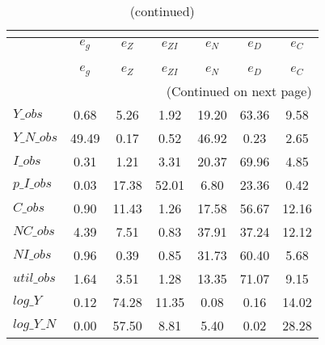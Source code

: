  
\begin{center}
\begin{longtable}{lcccccc} 
\caption{VARIANCE DECOMPOSITION (in percent)}\\
 \label{Table:th_var_decomp_uncond}\\
\toprule 
$           $	 & 	 $       {e_g}$	 & 	 $       {e_Z}$	 & 	 $    {e_{ZI}}$	 & 	 $       {e_N}$	 & 	 $       {e_D}$	 & 	 $       {e_C}$\\
\midrule \endfirsthead 
\caption{(continued)}\\
 \toprule \\ 
$           $	 & 	 $       {e_g}$	 & 	 $       {e_Z}$	 & 	 $    {e_{ZI}}$	 & 	 $       {e_N}$	 & 	 $       {e_D}$	 & 	 $       {e_C}$\\
\midrule \endhead 
\midrule \multicolumn{7}{r}{(Continued on next page)} \\ \bottomrule \endfoot 
\bottomrule \endlastfoot 
$Y\_obs     $	 & 	        0.68	 & 	        5.26	 & 	        1.92	 & 	       19.20	 & 	       63.36	 & 	        9.58 \\ 
$Y\_N\_obs  $	 & 	       49.49	 & 	        0.17	 & 	        0.52	 & 	       46.92	 & 	        0.23	 & 	        2.65 \\ 
$I\_obs     $	 & 	        0.31	 & 	        1.21	 & 	        3.31	 & 	       20.37	 & 	       69.96	 & 	        4.85 \\ 
$p\_I\_obs  $	 & 	        0.03	 & 	       17.38	 & 	       52.01	 & 	        6.80	 & 	       23.36	 & 	        0.42 \\ 
$C\_obs     $	 & 	        0.90	 & 	       11.43	 & 	        1.26	 & 	       17.58	 & 	       56.67	 & 	       12.16 \\ 
$NC\_obs    $	 & 	        4.39	 & 	        7.51	 & 	        0.83	 & 	       37.91	 & 	       37.24	 & 	       12.12 \\ 
$NI\_obs    $	 & 	        0.96	 & 	        0.39	 & 	        0.85	 & 	       31.73	 & 	       60.40	 & 	        5.68 \\ 
$util\_obs  $	 & 	        1.64	 & 	        3.51	 & 	        1.28	 & 	       13.35	 & 	       71.07	 & 	        9.15 \\ 
$log\_Y     $	 & 	        0.12	 & 	       74.28	 & 	       11.35	 & 	        0.08	 & 	        0.16	 & 	       14.02 \\ 
$log\_Y\_N  $	 & 	        0.00	 & 	       57.50	 & 	        8.81	 & 	        5.40	 & 	        0.02	 & 	       28.28 \\ 

\end{longtable}
\end{center}
